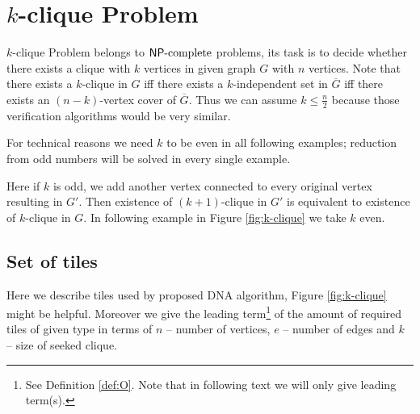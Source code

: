 \section{$k$-clique Problem}

$k$-clique Problem belongs to $\mathsf{NP}\textnormal{-complete}$ problems, its task is to decide whether there exists a clique with $k$ vertices in given graph $G$ with $n$ vertices. Note that there exists a $k$-clique in $G$ iff there exists a $k$-independent set in $\overline{G}$ iff there exists an $(n-k)$-vertex cover of $\overline{G}$. Thus we can assume $k \leq \frac{n}{2}$ because those verification algorithms would be very similar.

For technical reasons we need $k$ to be even in all following examples; reduction from odd numbers will be solved in every single example.

Here if $k$ is odd, we add another vertex connected to every original vertex resulting in $G'$. Then existence of $(k+1)$-clique in $G'$ is equivalent to existence of $k$-clique in $G$. In following example in Figure \ref{fig:k-clique} we take $k$ even.


\subsection*{Set of tiles}

Here we describe tiles used by proposed DNA algorithm, Figure \ref{fig:k-clique} might be helpful. Moreover we give the leading term\footnote{See Definition \ref{def:O}. Note that in following text we will only give leading term(s).} of the amount of required tiles of given type in terms of $n$ -- number of vertices, $e$ -- number of edges and $k$ -- size of seeked clique.

